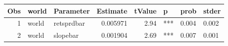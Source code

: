 

\begin{longtable}{|r|l|l|r|r|l|l|l|}\hline
   Obs &    world &    Parameter &    Estimate &    tValue &    p &    prob &    stder\\\hline
\endhead
   1 &    world &    retsprdbar &    0.005971 &    2.94 &    *** &    0.004 &    0.002\\\hline
   2 &    world &    slopebar &    0.001904 &    2.69 &    *** &    0.007 &    0.001\\\hline
\end{longtable}

